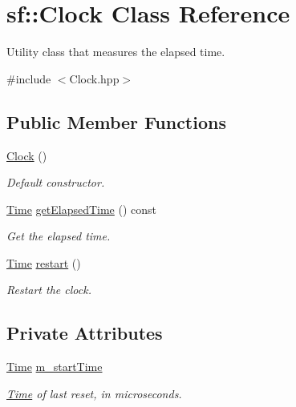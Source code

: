 \hypertarget{classsf_1_1_clock}{}\section{sf\+:\+:Clock Class Reference}
\label{classsf_1_1_clock}


Utility class that measures the elapsed time.  




{\ttfamily \#include $<$Clock.\+hpp$>$}

\subsection*{Public Member Functions}
\begin{DoxyCompactItemize}
\item 
\mbox{\hyperlink{classsf_1_1_clock_abbc959c7830ca7c3a4da133cb506d3fd}{Clock}} ()
\begin{DoxyCompactList}\small\item\em Default constructor. \end{DoxyCompactList}\item 
\mbox{\hyperlink{classsf_1_1_time}{Time}} \mbox{\hyperlink{classsf_1_1_clock_abe889b42a65bcd8eefc16419645d08a7}{get\+Elapsed\+Time}} () const
\begin{DoxyCompactList}\small\item\em Get the elapsed time. \end{DoxyCompactList}\item 
\mbox{\hyperlink{classsf_1_1_time}{Time}} \mbox{\hyperlink{classsf_1_1_clock_a123e2627f2943e5ecaa1db0c7df3231b}{restart}} ()
\begin{DoxyCompactList}\small\item\em Restart the clock. \end{DoxyCompactList}\end{DoxyCompactItemize}
\subsection*{Private Attributes}
\begin{DoxyCompactItemize}
\item 
\mbox{\label{classsf_1_1_clock_a8843eb0a9762787cecfecde181e0f337}} 
\mbox{\hyperlink{classsf_1_1_time}{Time}} \mbox{\hyperlink{classsf_1_1_clock_a8843eb0a9762787cecfecde181e0f337}{m\+\_\+start\+Time}}
\begin{DoxyCompactList}\small\item\em \mbox{\hyperlink{classsf_1_1_time}{Time}} of last reset, in microseconds. \end{DoxyCompactList}\end{DoxyCompactItemize}


